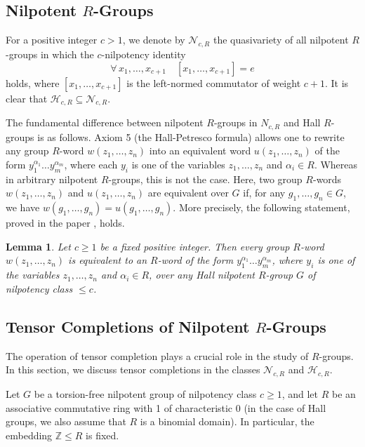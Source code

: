 \documentclass[11pt]{article}
\def\Z{{\mathbb Z}}
\def\N{{\mathbb N}}
\def\N{{\mathcal{N}}}
\newtheorem{lemma}{Lemma}[section]
\theoremstyle{definition}
\begin{document}
\subsection{Nilpotent \texorpdfstring{$R$}{}-Groups}\label{se:k-groups}

For a positive integer $c>1$, we denote by $\mathcal{N}_{c,R}$ the quasivariety of all nilpotent $R$-groups in which the $c$-nilpotency identity
$$  \forall\,x_1,\dots,x_{c+1}\quad [x_1,\dots,x_{c+1}]=e        $$
holds, where $[x_1,\dots,x_{c+1}]$ is the left-normed commutator of weight $c+1$.
It is clear that $\mathcal{H}_{c,R} \subseteq \N_{c,R}$.

The fundamental difference between nilpotent $R$-groups in $N_{c,R}$ and Hall $R$-groups is as follows.
Axiom 5 (the Hall-Petresco formula) allows one to rewrite any group $R$-word $w(z_1, \ldots,z_n)$ into an equivalent word $u(z_1, \ldots,z_n)$ of the form $y_1^{\alpha_1} \ldots y_m^{\alpha_m}$, where each $y_i$ is one of the variables $z_1, \ldots, z_n$ and $\alpha_i \in R$. Whereas in arbitrary nilpotent $R$-groups, this is not the case. Here, two group $R$-words $w(z_1, \ldots,z_n)$ and $u(z_1, \ldots,z_n)$ are equivalent over $G$ if, for any $g_1, \ldots,g_n \in G$, we have $w(g_1, \ldots,g_n) = u(g_1, \ldots,g_n)$.
More precisely, the following statement, proved in the paper \cite{ABM}, holds.

\begin{lemma} \label{le:rat-exp}
	 Let $c\geq 1$ be a fixed positive integer. Then every group $R$-word $w(z_1, \ldots,z_n)$ is equivalent to an $R$-word of the form $y_1^{\alpha_1} \ldots y_m^{\alpha_m}$, where $y_i$ is one of the variables $z_1, \ldots, z_n$ and $\alpha_i \in R$, over any Hall nilpotent $R$-group $G$ of nilpotency class $\leqslant c$.
		
\end{lemma}

\subsection{Tensor Completions of Nilpotent \texorpdfstring{$R$}{}-Groups}
\label{se:tensor-completions}

The operation of tensor completion plays a crucial role in the study of $R$-groups. In this section, we discuss tensor completions in the classes $\N_{c,R}$ and $\mathcal{H}_{c,R}$.

Let $G$ be a torsion-free nilpotent group of nilpotency class $c\geq 1$, and let $R$ be an associative commutative ring with 1 of characteristic 0 (in the case of Hall groups, we also assume that $R$ is a binomial domain). In particular, the embedding $\Z \leq R$ is fixed.
\end{document}
